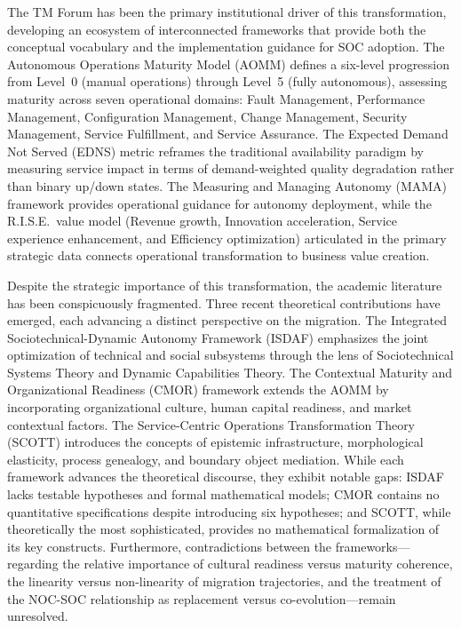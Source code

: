 \documentclass[12pt,a4paper]{article}
\begin{document}
The TM Forum has been the primary institutional driver of this transformation, developing an ecosystem of interconnected frameworks that provide both the conceptual vocabulary and the implementation guidance for SOC adoption. The Autonomous Operations Maturity Model (AOMM) \citep{tmforum2024b} defines a six-level progression from Level~0 (manual operations) through Level~5 (fully autonomous), assessing maturity across seven operational domains: Fault Management, Performance Management, Configuration Management, Change Management, Security Management, Service Fulfillment, and Service Assurance. The Expected Demand Not Served (EDNS) metric \citep{tmforum2024c} reframes the traditional availability paradigm by measuring service impact in terms of demand-weighted quality degradation rather than binary up/down states. The Measuring and Managing Autonomy (MAMA) framework \citep{tmforum2024d} provides operational guidance for autonomy deployment, while the R.I.S.E.\ value model (Revenue growth, Innovation acceleration, Service experience enhancement, and Efficiency optimization) articulated in the primary strategic data \citep{primary2026a,primary2026b} connects operational transformation to business value creation.

Despite the strategic importance of this transformation, the academic literature has been conspicuously fragmented. Three recent theoretical contributions have emerged, each advancing a distinct perspective on the migration. The Integrated Sociotechnical-Dynamic Autonomy Framework (ISDAF) emphasizes the joint optimization of technical and social subsystems through the lens of Sociotechnical Systems Theory and Dynamic Capabilities Theory. The Contextual Maturity and Organizational Readiness (CMOR) framework extends the AOMM by incorporating organizational culture, human capital readiness, and market contextual factors. The Service-Centric Operations Transformation Theory (SCOTT) introduces the concepts of epistemic infrastructure, morphological elasticity, process genealogy, and boundary object mediation. While each framework advances the theoretical discourse, they exhibit notable gaps: ISDAF lacks testable hypotheses and formal mathematical models; CMOR contains no quantitative specifications despite introducing six hypotheses; and SCOTT, while theoretically the most sophisticated, provides no mathematical formalization of its key constructs. Furthermore, contradictions between the frameworks---regarding the relative importance of cultural readiness versus maturity coherence, the linearity versus non-linearity of migration trajectories, and the treatment of the NOC-SOC relationship as replacement versus co-evolution---remain unresolved.
\end{document}
